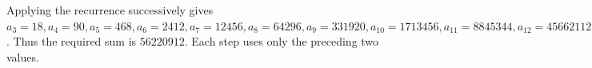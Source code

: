 Applying the recurrence successively gives $a_3=18,a_4=90,a_5=468,a_6=2412,a_7=12456,a_8=64296,a_9=331920,a_{10}=1713456,a_{11}=8845344,a_{12}=45662112$. Thus the required sum is $\boxed{56220912}$. Each step uses only the preceding two values.
